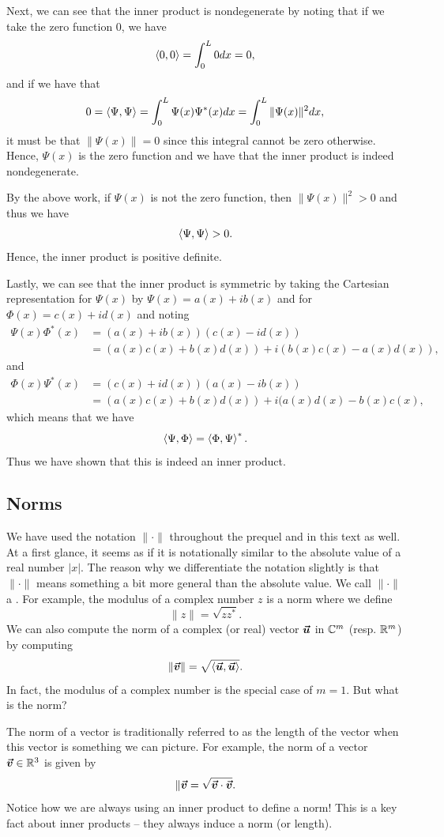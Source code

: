 Next, we can see that the inner product is nondegenerate by noting that if we take the zero function 0, we have
\[
\left\langle 0, 0 \right\rangle = \int_0^L 0 dx = 0,
\]
and if we have that
\[
0=\left\langle \Psi, \Psi \right\rangle  = \int_0^L \Psi(x)\Psi^*(x)dx = \int_0^L \|\Psi(x)\|^2dx,
\]
it must be that $\|\Psi(x)\|=0$ since this integral cannot be zero otherwise.  Hence, $\Psi(x)$ is the zero function and we have that the inner product is indeed nondegenerate.

By the above work, if $\Psi(x)$ is not the zero function, then $\|\Psi(x)\|^2>0$ and thus we have
\[
\left\langle \Psi, \Psi \right\rangle>0.
\]
Hence, the inner product is positive definite.

Lastly, we can see that the inner product is symmetric by taking the Cartesian representation for $\Psi(x)$ by $\Psi(x)=a(x)+ib(x)$ and for $\Phi(x)=c(x)+id(x)$ and noting
\begin{align*}
	\Psi(x)\Phi^*(x) &= (a(x)+ib(x))(c(x)-id(x))\\
		&= (a(x)c(x)+b(x)d(x))+i(b(x)c(x)-a(x)d(x)),
\end{align*}
and
\begin{align*}
	\Phi(x)\Psi^*(x) &= (c(x)+id(x))(a(x)-ib(x))\\
		&= (a(x)c(x)+b(x)d(x))+i(a(x)d(x)-b(x)c(x),
\end{align*}
which means that we have
\[
\left\langle \Psi, \Phi \right\rangle=\left\langle \Phi, \Psi \right\rangle^*.
\]
Thus we have shown that this is indeed an inner product.

\subsection{Norms}

We have used the notation $\|\cdot\|$ throughout the prequel and in this text as well. At a first glance, it seems as if it is notationally similar to the absolute value of a real number $|x|$. The reason why we differentiate the notation slightly is that $\|\cdot\|$ means something a bit more general than the absolute value. We call $\|\cdot\|$ a . For example, the modulus of a complex number $z$ is a norm where we define
\[
\|z\|=\sqrt{zz^*}.
\]
We can also compute the norm of a complex (or real) vector $\boldsymbol{\boldsymbol{\vec{u}}}$ in $\mathbb{C}^m$ (resp. $\mathbb{R}^m$) by computing 
\[
\|\boldsymbol{\boldsymbol{\vec{v}}}\| = \sqrt{\left\langle \boldsymbol{\boldsymbol{\vec{u}}}, \boldsymbol{\boldsymbol{\vec{u}}} \right\rangle}.
\]
In fact, the modulus of a complex number is the special case of $m=1$.  But what is the norm?

The norm of a vector is traditionally referred to as the length of the vector when this vector is something we can picture. For example, the norm of a vector $\boldsymbol{\boldsymbol{\vec{v}}} \in \mathbb{R}^3$ is given by
\[
\|\boldsymbol{\boldsymbol{\vec{v}}} = \sqrt{\boldsymbol{\boldsymbol{\vec{v}}} \cdot \boldsymbol{\boldsymbol{\vec{v}}}}.
\]
Notice how we are always using an inner product to define a norm! This is a key fact about inner products -- they always induce a norm (or length). 

